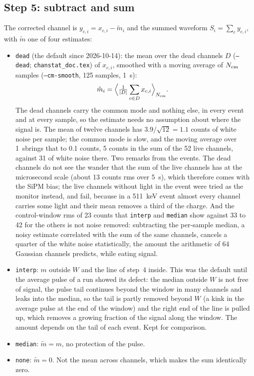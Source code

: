 \documentclass[11pt]{article}
\newcommand{\code}[1]{\texttt{#1}}
\newcommand{\us}{\textmu s}
\begin{document}
\subsection{Step 5: subtract and sum}

The corrected channel is $y_{c,i} = x_{c,i} - \tilde m_i$ and the summed
waveform $S_i = \sum_c y_{c,i}$, with $\tilde m$ one of four estimates:
\begin{itemize}
\item \code{dead} (the default since 2026-10-14): the mean over the dead
  channels $D$ (\code{--dead}; \code{chanstat\_doc.tex}) of $x_{c,i}$,
  smoothed with a moving average of $N_{\rm cm}$ samples
  (\code{--cm-smooth}, 125 samples, 1~\us):
  \[
    \tilde m_i = \Big\langle \tfrac{1}{|D|} \sum_{c \in D} x_{c,i} \Big\rangle_{N_{\rm cm}}.
  \]
  The dead channels carry the common mode and nothing else, in every
  event and at every sample, so the estimate needs no assumption about
  where the signal is. The mean of twelve channels has $3.9/\sqrt{12} =
  1.1$ counts of white noise per sample; the common mode is slow, and the
  moving average over 1~\us brings that to 0.1 counts, 5 counts in the sum
  of the 52 live channels, against 31 of white noise there. Two
  remarks from the events. The dead channels do not see the wander that
  the sum of the live channels has at the microsecond scale (about 13
  counts rms over 5~\us), which therefore comes with the SiPM bias; the
  live channels without light in the event were tried as the monitor
  instead, and fail, because in a 511~keV event almost every channel
  carries some light and their mean removes a third of the charge. And
  the control-window rms of 23 counts that \code{interp} and
  \code{median} show against 33 to 42 for the others is not noise
  removed: subtracting the per-sample median, a noisy estimate correlated
  with the sum of the same channels, cancels a quarter of the white noise
  statistically, the amount the arithmetic of 64 Gaussian channels
  predicts, while eating signal.
\item \code{interp}: $m$ outside $W$ and the line of step~4 inside. This
  was the default until the average pulse of a run showed its defect: the
  median outside $W$ is not free of signal, the pulse tail continues
  beyond the window in many channels and leaks into the median, so the
  tail is partly removed beyond $W$ (a kink in the average pulse at the
  end of the window) and the right end of the line is pulled up, which
  removes a growing fraction of the signal along the window. The amount
  depends on the tail of each event. Kept for comparison.
\item \code{median}: $\tilde m = m$, no protection of the pulse.
\item \code{none}: $\tilde m = 0$. Not the mean across channels, which
  makes the sum identically zero.
\end{itemize}
\end{document}
